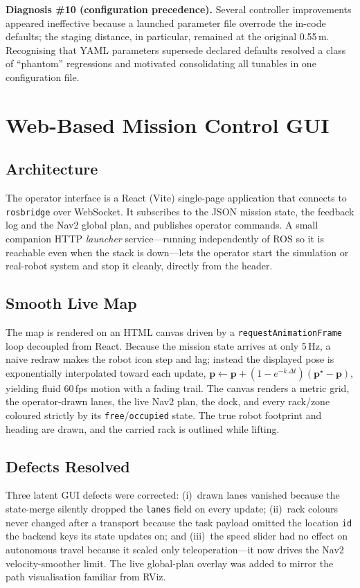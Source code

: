 \documentclass[11pt,a4paper]{article}
\newcommand{\code}[1]{\texttt{\small #1}}
\begin{document}
\textbf{Diagnosis \#10 (configuration precedence).} Several controller
improvements appeared ineffective because a launched parameter file
overrode the in-code defaults; the staging distance, in particular, remained
at the original 0.55\,m. Recognising that YAML parameters supersede declared
defaults resolved a class of ``phantom'' regressions and motivated
consolidating all tunables in one configuration file.

\section{Web-Based Mission Control GUI}\label{sec:gui}
\subsection{Architecture}
The operator interface is a React (Vite) single-page application that
connects to \code{rosbridge} over WebSocket. It subscribes to the JSON
mission state, the feedback log and the Nav2 global plan, and publishes
operator commands. A small companion HTTP \emph{launcher} service---running
independently of ROS so it is reachable even when the stack is down---lets
the operator start the simulation or real-robot system and stop it cleanly,
directly from the header.

\subsection{Smooth Live Map}
The map is rendered on an HTML canvas driven by a \code{requestAnimationFrame}
loop decoupled from React. Because the mission state arrives at only 5\,Hz, a
naive redraw makes the robot icon step and lag; instead the displayed pose is
exponentially interpolated toward each update,
$\mathbf p \leftarrow \mathbf p + (1-e^{-k\,\Delta t})(\mathbf p^\star-\mathbf p)$,
yielding fluid 60\,fps motion with a fading trail. The canvas renders a metric
grid, the operator-drawn lanes, the live Nav2 plan, the dock, and every
rack/zone coloured strictly by its \code{free}/\code{occupied} state. The true
robot footprint and heading are drawn, and the carried rack is outlined while
lifting.

\subsection{Defects Resolved}
Three latent GUI defects were corrected: (i)~drawn lanes vanished because the
state-merge silently dropped the \code{lanes} field on every update;
(ii)~rack colours never changed after a transport because the task payload
omitted the location \code{id} the backend keys its state updates on; and
(iii)~the speed slider had no effect on autonomous travel because it scaled
only teleoperation---it now drives the Nav2 velocity-smoother limit. The live
global-plan overlay was added to mirror the path visualisation familiar from
RViz.
\end{document}
